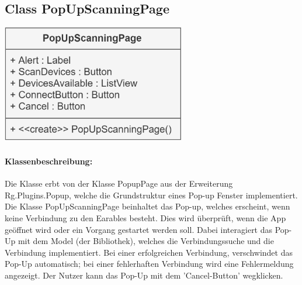 \documentclass[a4paper,12pt]{article}
\begin{document}
	\begin{minipage}[b]{0.6\textwidth}
		\subsection{Class PopUpScanningPage}
	\end{minipage}
	\begin{minipage}[c]{0.5\textwidth}
		\includegraphics[width=0.6\textwidth]{bilder/ViewKlassen/PopUpScanningPageClass.png}
	\end{minipage}
		\paragraph{Klassenbeschreibung:}
		Die Klasse erbt von der Klasse PopupPage aus der Erweiterung \Gls{Rg.Plugins.Popup}, welche die Grundstruktur eines Pop-up Fenster implementiert.\\
		Die Klasse PopUpScanningPage beinhaltet das Pop-up, welches erscheint, wenn keine Verbindung zu den \gls{Earables} besteht. Dies wird überprüft, wenn die App geöffnet wird oder ein Vorgang gestartet werden soll. Dabei interagiert das Pop-Up mit dem Model (der Bibliothek), welches die Verbindungssuche und die Verbindung implementiert. Bei einer erfolgreichen Verbindung, verschwindet das Pop-Up automatisch; bei einer fehlerhaften Verbindung wird eine Fehlermeldung angezeigt. Der Nutzer kann das Pop-Up mit dem 'Cancel-Button' wegklicken. 
\end{document}
